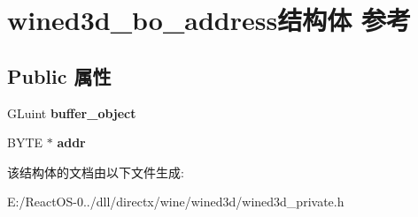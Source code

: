 \hypertarget{structwined3d__bo__address}{}\section{wined3d\+\_\+bo\+\_\+address结构体 参考}
\label{structwined3d__bo__address}
\subsection*{Public 属性}
\begin{DoxyCompactItemize}
\item 
\mbox{\label{structwined3d__bo__address_aae5a0caa05c6ebf00b1399212f7fa7f6}} 
G\+Luint {\bfseries buffer\+\_\+object}
\item 
\mbox{\label{structwined3d__bo__address_afb5c28fb95e63e6e1a5a17467e515c6b}} 
B\+Y\+TE $\ast$ {\bfseries addr}
\end{DoxyCompactItemize}


该结构体的文档由以下文件生成\+:\begin{DoxyCompactItemize}
\item 
E\+:/\+React\+O\+S-\/0../dll/directx/wine/wined3d/wined3d\+\_\+private.\+h\end{DoxyCompactItemize}
